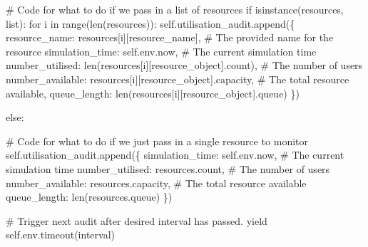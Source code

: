 \documentclass[
  letterpaper,
  DIV=11,
  numbers=noendperiod]{scrreprt}
\newenvironment{Shaded}{\begin{snugshade}}{\end{snugshade}}
\newcommand{\BuiltInTok}[1]{\textcolor[rgb]{0.00,0.23,0.31}{#1}}
\newcommand{\CommentTok}[1]{\textcolor[rgb]{0.37,0.37,0.37}{#1}}
\newcommand{\ControlFlowTok}[1]{\textcolor[rgb]{0.00,0.23,0.31}{#1}}
\newcommand{\KeywordTok}[1]{\textcolor[rgb]{0.00,0.23,0.31}{#1}}
\newcommand{\NormalTok}[1]{\textcolor[rgb]{0.00,0.23,0.31}{#1}}
\newcommand{\StringTok}[1]{\textcolor[rgb]{0.13,0.47,0.30}{#1}}
\newcommand{\VariableTok}[1]{\textcolor[rgb]{0.07,0.07,0.07}{#1}}
\begin{document}
\begin{Shaded}
\begin{Highlighting}[]
        \CommentTok{\# Code for what to do if we pass in a list of resources}
        \ControlFlowTok{if} \BuiltInTok{isinstance}\NormalTok{(resources, }\BuiltInTok{list}\NormalTok{):}
            \ControlFlowTok{for}\NormalTok{ i }\KeywordTok{in} \BuiltInTok{range}\NormalTok{(}\BuiltInTok{len}\NormalTok{(resources)):}
                \VariableTok{self}\NormalTok{.utilisation\_audit.append(\{}
                    \StringTok{\textquotesingle{}resource\_name\textquotesingle{}}\NormalTok{: resources[i][}\StringTok{\textquotesingle{}resource\_name\textquotesingle{}}\NormalTok{], }\CommentTok{\# The provided name for the resource}
                    \StringTok{\textquotesingle{}simulation\_time\textquotesingle{}}\NormalTok{: }\VariableTok{self}\NormalTok{.env.now,  }\CommentTok{\# The current simulation time}
                    \StringTok{\textquotesingle{}number\_utilised\textquotesingle{}}\NormalTok{: }\BuiltInTok{len}\NormalTok{(resources[i][}\StringTok{\textquotesingle{}resource\_object\textquotesingle{}}\NormalTok{].count), }\CommentTok{\# The number of users}
                    \StringTok{\textquotesingle{}number\_available\textquotesingle{}}\NormalTok{: resources[i][}\StringTok{\textquotesingle{}resource\_object\textquotesingle{}}\NormalTok{].capacity, }\CommentTok{\# The total resource available,}
                    \StringTok{\textquotesingle{}queue\_length\textquotesingle{}}\NormalTok{: }\BuiltInTok{len}\NormalTok{(resources[i][}\StringTok{\textquotesingle{}resource\_object\textquotesingle{}}\NormalTok{].queue)}
\NormalTok{                \})}

        \ControlFlowTok{else}\NormalTok{:}

            \CommentTok{\# Code for what to do if we just pass in a single resource to monitor}
            \VariableTok{self}\NormalTok{.utilisation\_audit.append(\{}
                \StringTok{\textquotesingle{}simulation\_time\textquotesingle{}}\NormalTok{: }\VariableTok{self}\NormalTok{.env.now,  }\CommentTok{\# The current simulation time}
                \StringTok{\textquotesingle{}number\_utilised\textquotesingle{}}\NormalTok{: resources.count,  }\CommentTok{\# The number of users}
                \StringTok{\textquotesingle{}number\_available\textquotesingle{}}\NormalTok{: resources.capacity, }\CommentTok{\# The total resource available}
                \StringTok{\textquotesingle{}queue\_length\textquotesingle{}}\NormalTok{: }\BuiltInTok{len}\NormalTok{(resources.queue)}
\NormalTok{            \})}


        \CommentTok{\# Trigger next audit after desired interval has passed.}
        \ControlFlowTok{yield} \VariableTok{self}\NormalTok{.env.timeout(interval)}
\end{Highlighting}
\end{Shaded}
\end{document}
